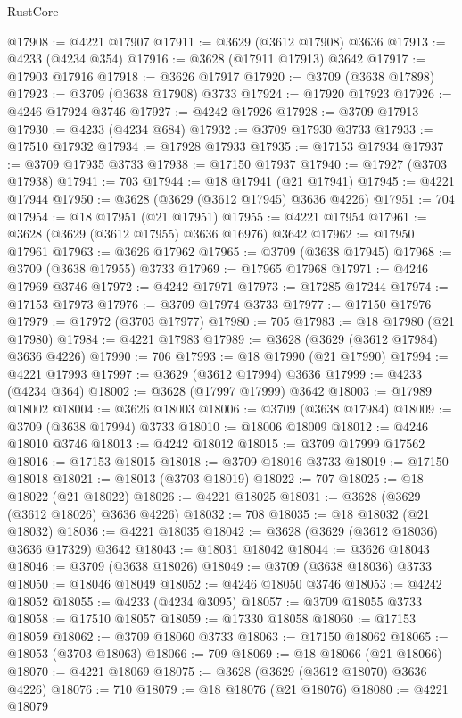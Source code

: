 \begin{lexlean}{RustCore}
\begin{coremodule}
@17908 := @4221 @17907
@17911 := @3629 (@3612 @17908) @3636
@17913 := @4233 (@4234 @354)
@17916 := @3628 (@17911 @17913) @3642
@17917 := @17903 @17916
@17918 := @3626 @17917
@17920 := @3709 (@3638 @17898)
@17923 := @3709 (@3638 @17908) @3733
@17924 := @17920 @17923
@17926 := @4246 @17924 @3746
@17927 := @4242 @17926
@17928 := @3709 @17913
@17930 := @4233 (@4234 @684)
@17932 := @3709 @17930 @3733
@17933 := @17510 @17932
@17934 := @17928 @17933
@17935 := @17153 @17934
@17937 := @3709 @17935 @3733
@17938 := @17150 @17937
@17940 := @17927 (@3703 @17938)
@17941 := 703
@17944 := @18 @17941 (@21 @17941)
@17945 := @4221 @17944
@17950 := @3628 (@3629 (@3612 @17945) @3636 @4226)
@17951 := 704
@17954 := @18 @17951 (@21 @17951)
@17955 := @4221 @17954
@17961 := @3628 (@3629 (@3612 @17955) @3636 @16976) @3642
@17962 := @17950 @17961
@17963 := @3626 @17962
@17965 := @3709 (@3638 @17945)
@17968 := @3709 (@3638 @17955) @3733
@17969 := @17965 @17968
@17971 := @4246 @17969 @3746
@17972 := @4242 @17971
@17973 := @17285 @17244
@17974 := @17153 @17973
@17976 := @3709 @17974 @3733
@17977 := @17150 @17976
@17979 := @17972 (@3703 @17977)
@17980 := 705
@17983 := @18 @17980 (@21 @17980)
@17984 := @4221 @17983
@17989 := @3628 (@3629 (@3612 @17984) @3636 @4226)
@17990 := 706
@17993 := @18 @17990 (@21 @17990)
@17994 := @4221 @17993
@17997 := @3629 (@3612 @17994) @3636
@17999 := @4233 (@4234 @364)
@18002 := @3628 (@17997 @17999) @3642
@18003 := @17989 @18002
@18004 := @3626 @18003
@18006 := @3709 (@3638 @17984)
@18009 := @3709 (@3638 @17994) @3733
@18010 := @18006 @18009
@18012 := @4246 @18010 @3746
@18013 := @4242 @18012
@18015 := @3709 @17999 @17562
@18016 := @17153 @18015
@18018 := @3709 @18016 @3733
@18019 := @17150 @18018
@18021 := @18013 (@3703 @18019)
@18022 := 707
@18025 := @18 @18022 (@21 @18022)
@18026 := @4221 @18025
@18031 := @3628 (@3629 (@3612 @18026) @3636 @4226)
@18032 := 708
@18035 := @18 @18032 (@21 @18032)
@18036 := @4221 @18035
@18042 := @3628 (@3629 (@3612 @18036) @3636 @17329) @3642
@18043 := @18031 @18042
@18044 := @3626 @18043
@18046 := @3709 (@3638 @18026)
@18049 := @3709 (@3638 @18036) @3733
@18050 := @18046 @18049
@18052 := @4246 @18050 @3746
@18053 := @4242 @18052
@18055 := @4233 (@4234 @3095)
@18057 := @3709 @18055 @3733
@18058 := @17510 @18057
@18059 := @17330 @18058
@18060 := @17153 @18059
@18062 := @3709 @18060 @3733
@18063 := @17150 @18062
@18065 := @18053 (@3703 @18063)
@18066 := 709
@18069 := @18 @18066 (@21 @18066)
@18070 := @4221 @18069
@18075 := @3628 (@3629 (@3612 @18070) @3636 @4226)
@18076 := 710
@18079 := @18 @18076 (@21 @18076)
@18080 := @4221 @18079

\end{coremodule}
\end{lexlean}
